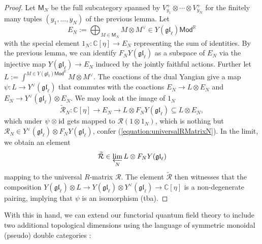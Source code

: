 \documentclass[11pt]{report}
\theoremstyle{definition}
\theoremstyle{remark}
\theoremstyle{remark}
\newcommand{\id}{\textnormal{id}}
\newcommand{\R}{\mathbb{R}}
\newcommand{\C}{\mathbb{C}}
\begin{document}
\begin{proof}
Let $\mathsf{M}_N$ be the full subcategory spanned by $V_{y_1}^+ \otimes \cdots \otimes V_{y_N}^+$ for the finitely many tuples $(y_1,...,y_N)$ of the previous lemma. Let
\begin{equation*}
E_N := \bigoplus_{M \in \mathsf{M}_N} M \otimes M^\vee \in Y(\mathfrak{gl}_\ell)\mathsf{Mod}^\R
\end{equation*}
with the special element $1_N: \C[\eta] \to E_N$ representing the sum of identities. By the previous lemma, we can identify $F_N Y(\mathfrak{gl}_\ell)$ as a subspace of $E_N$ via the injective map $Y(\mathfrak{gl}_\ell) \to E_N$ induced by the jointly faithful actions. Further let $L := \int^{M \in Y(\mathfrak{gl}_\ell)\mathsf{Mod}^\R} M \otimes M^\vee$. The coactions of the dual Yangian give a map $\psi: L \to Y^\vee(\mathfrak{gl}_\ell)$ that commutes with the coactions $E_N \to L \otimes E_N$ and $E_N \to Y^\vee(\mathfrak{gl}_\ell) \otimes E_N$. We may look at the image of $1_N$
\begin{equation*}
\widetilde{\mathcal{R}}_N: \C[\eta] \to E_N \to L \otimes F_N Y(\mathfrak{gl}_\ell) \subseteq L \otimes E_N,
\end{equation*}
which under $\psi \otimes \id$ gets mapped to $\mathcal{R}(1 \otimes 1_N)$, which is nothing but $\mathcal{R}_N \in Y^\vee(\mathfrak{gl}_\ell) \otimes F_N Y(\mathfrak{gl}_\ell)$, confer (\ref{equation:universalRMatrixN}). In the limit, we obtain an element
\begin{equation*}
\widetilde{\mathcal{R}} \in \varprojlim_N L \otimes F_N Y(\mathfrak{gl}_\ell)
\end{equation*}
mapping to the universal $R$-matrix $\mathcal{R}$. The element $\widetilde{\mathcal{R}}$ then witnesses that the composition $Y(\mathfrak{gl}_\ell) \otimes L \to Y(\mathfrak{gl}_\ell) \otimes Y^\vee(\mathfrak{gl}_\ell) \to \C[\eta]$ is a non-degenerate pairing, implying that $\psi$ is an isomorphism (tba).
\end{proof}

With this in hand, we can extend our functorial quantum field theory to include two additional topological dimensions using the language of symmetric monoidal (pseudo) double categories \cite{article:hansen:2019}:
\end{document}
